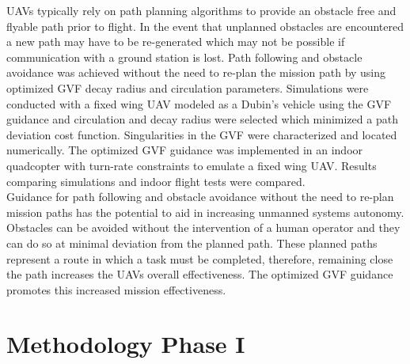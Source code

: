 \documentclass[numbered,pdftex]{ohio-etd}
\begin{document}
UAVs typically rely on path planning algorithms to provide an obstacle free and flyable path prior to flight. In the event that unplanned obstacles are encountered a new path may have to be re-generated which may not be possible if communication with a ground station is lost. Path following and obstacle avoidance was achieved without the need to re-plan the mission path by using optimized GVF decay radius and circulation parameters. Simulations were conducted with a fixed wing UAV modeled as a Dubin's vehicle using the GVF guidance and circulation and decay radius were selected which minimized a path deviation cost function. Singularities in the GVF were characterized and located numerically. The optimized GVF guidance was implemented in an indoor quadcopter with turn-rate constraints to emulate a fixed wing UAV. Results comparing simulations and indoor flight tests were compared. \\

Guidance for path following and obstacle avoidance without the need to re-plan mission paths has the potential to aid in increasing unmanned systems autonomy. Obstacles can be avoided without the intervention of a human operator and they can do so at minimal deviation from the planned path. These planned paths represent a route in which a task must be completed, therefore, remaining close the path increases the UAVs overall effectiveness. The optimized GVF guidance promotes this increased mission effectiveness. 


\appendix
\chapter{Methodology Phase I}
\end{document}
